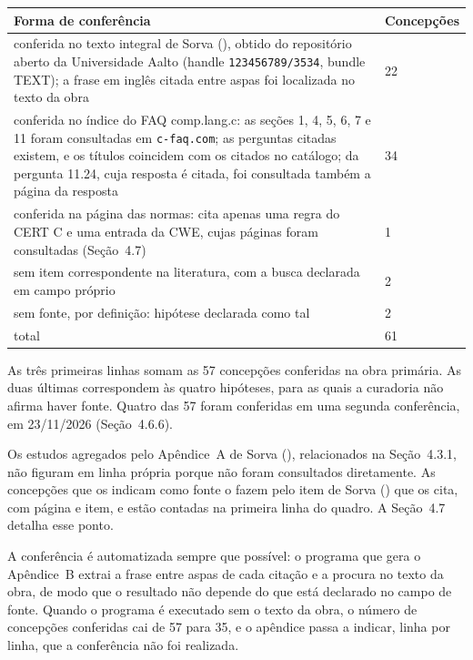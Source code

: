 \begin{quadro}[htbp]
\caption{Forma de conferência de cada uma das 61 concepções}\label{qua:4-4}
\footnotesize
\begin{tabularx}{\textwidth}{|X|l|}
\hline
\textbf{Forma de conferência} & \textbf{Concepções} \\ \hline
conferida no texto integral de Sorva (\citeyear{sorva2012}), obtido do repositório aberto da Universidade Aalto (handle \texttt{123456789/3534}, bundle TEXT); a frase em inglês citada entre aspas foi localizada no texto da obra & 22 \\ \hline
conferida no índice do FAQ comp.lang.c: as seções 1, 4, 5, 6, 7 e 11 foram consultadas em \texttt{c-{}faq.com}; as perguntas citadas existem, e os títulos coincidem com os citados no catálogo; da pergunta 11.24, cuja resposta é citada, foi consultada também a página da resposta & 34 \\ \hline
conferida na página das normas: cita apenas uma regra do CERT C e uma entrada da CWE, cujas páginas foram consultadas (Seção~4.7) & 1 \\ \hline
sem item correspondente na literatura, com a busca declarada em campo próprio & 2 \\ \hline
sem fonte, por definição: hipótese declarada como tal & 2 \\ \hline
total & 61 \\ \hline
\end{tabularx}
\end{quadro}

As três primeiras linhas somam as 57 concepções conferidas na obra primária. As duas últimas correspondem às quatro hipóteses, para as quais a curadoria não afirma haver fonte. Quatro das 57 foram conferidas em uma segunda conferência, em 23/11/2026 (Seção~4.6.6).

Os estudos agregados pelo Apêndice~A de Sorva (\citeyear{sorva2012}), relacionados na Seção~4.3.1, não figuram em linha própria porque não foram consultados diretamente. As concepções que os indicam como fonte o fazem pelo item de Sorva (\citeyear{sorva2012}) que os cita, com página e item, e estão contadas na primeira linha do quadro. A Seção~4.7 detalha esse ponto.

A conferência é automatizada sempre que possível: o programa que gera o Apêndice~B extrai a frase entre aspas de cada citação e a procura no texto da obra, de modo que o resultado não depende do que está declarado no campo de fonte. Quando o programa é executado sem o texto da obra, o número de concepções conferidas cai de 57 para 35, e o apêndice passa a indicar, linha por linha, que a conferência não foi realizada.


